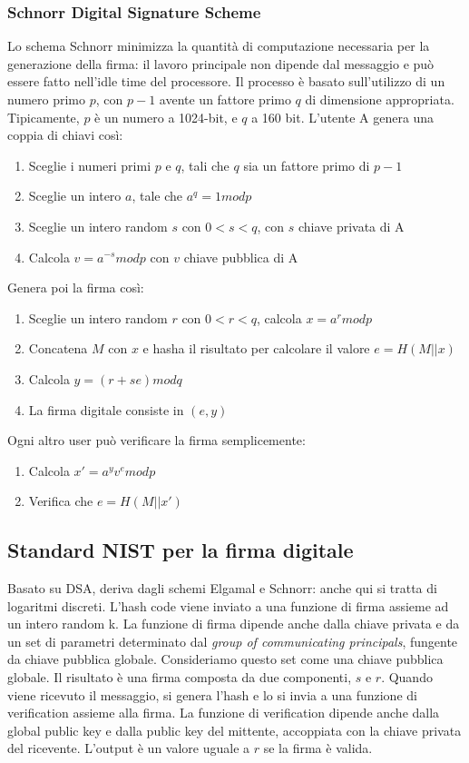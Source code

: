\documentclass[11pt]{article}
\begin{document}
\subsubsection{Schnorr Digital Signature Scheme}
Lo schema Schnorr minimizza la quantità di computazione necessaria per la generazione della firma: il lavoro principale non dipende dal messaggio e può essere fatto nell'idle time del processore. Il processo è basato sull'utilizzo di un numero primo $p$, con $p-1$ avente un fattore primo $q$ di dimensione appropriata. Tipicamente, $p$ è un numero a 1024-bit, e $q$ a 160 bit.
L'utente A genera una coppia di chiavi così:
\begin{enumerate}
    \item Sceglie i numeri primi $p$ e $q$, tali che $q$ sia un fattore primo di $p-1$
    \item Sceglie un intero $a$, tale che $a^q= 1 mod p$
    \item Sceglie un intero random $s$ con $0<s<q$, con $s$ chiave privata di A
    \item Calcola $v=a^{-s} mod p$ con $v$ chiave pubblica di A
\end{enumerate}
Genera poi la firma così:
\begin{enumerate}
    \item Sceglie un intero random $r$ con $0<r<q$, calcola $x = a^r mod p$
    \item Concatena $M$ con $x$ e hasha il risultato per calcolare il valore $e = H(M || x)$
    \item Calcola $y = (r+se) mod q$
    \item La firma digitale consiste in $(e,y)$
\end{enumerate}
Ogni altro user può verificare la firma semplicemente:
\begin{enumerate}
    \item Calcola $x' = a^y v^e mod p$
    \item Verifica che $e=H(M || x')$
\end{enumerate}
\subsection{Standard NIST per la firma digitale}
Basato su DSA, deriva dagli schemi Elgamal e Schnorr: anche qui si tratta di logaritmi discreti. L'hash code viene inviato a una funzione di firma assieme ad un intero random k. La funzione di firma dipende anche dalla chiave privata e da un set di parametri determinato dal \textit{group of communicating principals}, fungente da chiave pubblica globale. Consideriamo questo set come una chiave pubblica globale. Il risultato è una firma composta da due componenti, $s$ e $r$. Quando viene ricevuto il messaggio, si genera l'hash e lo si invia a una funzione di verification assieme alla firma. La funzione di verification dipende anche dalla global public key e dalla public key del mittente, accoppiata con la chiave privata del ricevente. L'output è un valore uguale a $r$ se la firma è valida. 
\end{document}
